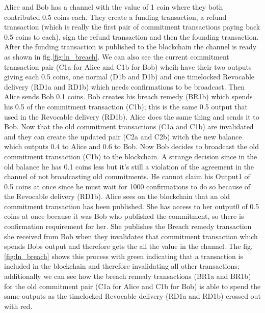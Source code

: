 Alice and Bob has a channel with the value of 1 coin where they both contributed 0.5 coins each. They create a funding transaction, a refund transaction (which is really the first pair of commitment transactions paying back 0.5 coins to each), sign the refund transaction and then the founding transaction. After the funding transaction is published to the blockchain the channel is ready as shown in fig.\ref{fig:ln_breach}. We can also see the current commitment transaction pair (C1a for Alice and C1b for Bob) whcih have their two outputs giving each 0.5 coins, one normal (D1b and D1b) and one timelocked Revocable delivery (RD1a and RD1b) which needs confirmations to be broadcast. Then Alice sends Bob 0.1 coins. Bob creates his breach remedy (BR1b) which spends his 0.5 of the commitment transaction (C1b); this is the same 0.5 output that used in the Revocable delivery (RD1b).
Alice does the same thing and sends it to Bob. Now that the old commitment transactions (C1a and C1b) are invalidated and they can create the updated pair (C2a and C2b) witch the new balance which outputs 0.4 to Alice and 0.6 to Bob. Now Bob decides to broadcast the old commitment transaction (C1b) to the blockchain. A strange decision since in the old balance he has 0.1 coins less but it's still a violation of the agreement in the channel of not broadcasting old commitments. 
He cannot claim his Output1 of 0.5 coins at once since he must wait for 1000 confirmations to do so because of the Revocable delivery (RD1b).
Alice sees on the blockchain that an old commitment transaction has been published. She has access to her output0 of 0.5 coins at once because it was Bob who published the commitment, so there is confirmation requirement for her. She publishes the Breach remedy transaction she received from Bob when they invalidates that commitment transaction which spends Bobs output and therefore gets the all the value in the channel. The fig.\ref{fig:ln_breach} shows this process with green indicating that a transaction is included in the blockchain and therefore invalidating all other transactions; additionally we can see how the breach remedy transactions (BR1a and BR1b) for the old commitment pair (C1a for Alice and C1b for Bob) is able to spend the same outputs as the timelocked Revocable delivery (RD1a and RD1b) crossed out with red.

